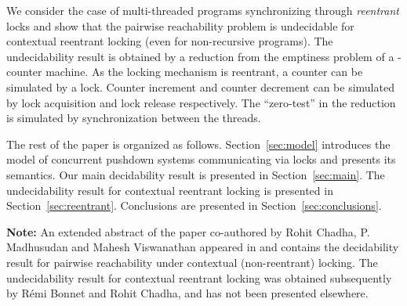 \documentclass{LMCS}
\begin{document}
We  consider the case of multi-threaded programs synchronizing through \emph{reentrant} locks and show
 that the pairwise reachability problem is undecidable for contextual reentrant locking (even for non-recursive programs). 
The undecidability result is obtained by a reduction from the emptiness problem of a -counter machine. 
As the locking mechanism is reentrant,  a counter can be simulated by a lock. Counter increment and counter decrement can be
simulated by lock acquisition and lock release respectively. The ``zero-test'' in the reduction is simulated by 
synchronization between the  threads.

The rest of the paper is organized as follows. Section~\ref{sec:model}
introduces the model of concurrent pushdown systems communicating
via locks and presents its semantics. Our main decidability result
is presented in Section~\ref{sec:main}. The undecidability result for contextual reentrant locking is presented in Section~\ref{sec:reentrant}. Conclusions are presented in
Section~\ref{sec:conclusions}.


{\bf Note:} An extended abstract of the paper  co-authored by Rohit Chadha, P. Madhusudan and Mahesh Viswanathan appeared in
\cite{rch:pm:mv:12} and contains the decidability
 result for pairwise reachability under contextual (non-reentrant) locking.
The undecidability result for contextual reentrant locking was obtained subsequently by R\'emi Bonnet and Rohit Chadha,
and has not been presented elsewhere. 
\end{document}

